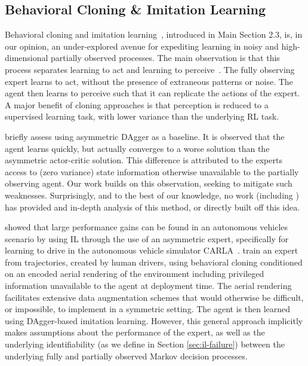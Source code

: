 \subsection{Behavioral Cloning \& Imitation Learning}
Behavioral cloning and imitation learning~\citep{pmlr-v80-kang18a, Ross2011}, introduced in Main Section 2.3, is, in our opinion, an under-explored avenue for expediting learning in noisy and high-dimensional partially observed processes.  The main observation is that this process separates learning to act and learning to perceive~\citep{Chen2019}.  The fully observing expert learns to act, without the presence of extraneous patterns or noise.  The agent then learns to perceive such that it can replicate the actions of the expert.  A major benefit of cloning approaches is that perception is reduced to a supervised learning task, with lower variance than the underlying RL task.  

\citet{pinto2017asymmetric} briefly assess using asymmetric DAgger as a baseline.  It is observed that the agent learns quickly, but actually converges to a worse solution than the asymmetric actor-critic solution.  This difference is attributed to the experts access to (zero variance) state information otherwise unavailable to the partially observing agent.  Our work builds on this observation, seeking to mitigate such weaknesses.  Surprisingly, and to the best of our knowledge, no work (including \citet{pinto2017asymmetric}) has provided and in-depth analysis of this method, or directly built off this idea.  

\citet{Chen2019} showed that large performance gains can be found in an autonomous vehicles scenario by using IL through the use of an asymmetric expert, specifically for learning to drive in the autonomous vehicle simulator CARLA~\citep{Dosovitskiy17}.  \citet{Chen2019} train an expert from trajectories, created by human drivers, using behavioral cloning conditioned on an encoded aerial rendering of the environment including privileged information unavailable to the agent at deployment time.  The aerial rendering facilitates extensive data augmentation schemes that would otherwise be difficult, or impossible, to implement in a symmetric setting.  The agent is then learned using DAgger-based imitation learning.  However, this general approach implicitly makes assumptions about the performance of the expert, as well as the underlying identifiability (as we define in Section \ref{sec:il-failure}) between the underlying fully and partially observed Markov decision processes.

